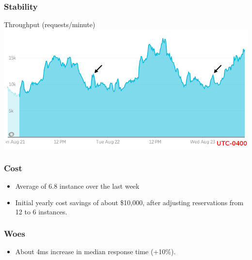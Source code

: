 \documentclass{beamer}
\begin{document}
\begin{frame}
\frametitle{Stability}
\begin{center}
Throughput (requests/minute)
\includegraphics[width=\textwidth]{throughput_arrows.png}
\end{center}
\end{frame}

\begin{frame}
\frametitle{Cost}
\begin{itemize}
\item Average of 6.8 instance over the last week
\item Initial yearly cost savings of about \$10,000, after adjusting reservations from 12 to 6 instances.
\end{itemize}
\end{frame}

\begin{frame}
\frametitle{Woes}
\begin{itemize}
\item About 4ms increase in median response time (+10\%).
\end{itemize}
\end{frame}
\end{document}
